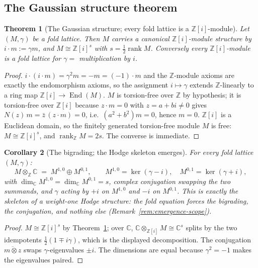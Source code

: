 \documentclass[11pt]{article}
\newcommand{\C}{\mathbb C}
\newcommand{\Z}{\mathbb Z}
\newcommand{\End}{\operatorname{End}}
\newtheorem{theorem}{Theorem}[section]
\newtheorem{corollary}[theorem]{Corollary}
\begin{document}
\subsection{The Gaussian structure theorem}

\begin{theorem}[The Gaussian structure; every fold lattice is a
{$\Z[i]$}-module]\label{thm:gaussian}
Let $(M,\gamma)$ be a fold lattice. Then $M$ carries a canonical
$\Z[i]$-module structure by $i\cdot m:=\gamma m$, and
$M\cong\Z[i]^s$ with $s=\tfrac12\operatorname{rank}M$. Conversely every
$\Z[i]$-module is a fold lattice for $\gamma=$ multiplication by $i$.
\end{theorem}

\begin{proof}
$i\cdot(i\cdot m)=\gamma^2m=-m=(-1)\cdot m$ and the $\Z$-module
axioms are exactly the endomorphism axioms, so the assignment
$i\mapsto\gamma$ extends $\Z$-linearly to a ring map
$\Z[i]\to\End(M)$. $M$ is torsion-free over $\Z$ by hypothesis; it is
torsion-free over $\Z[i]$ because $z\cdot m=0$ with $z=a+bi\ne 0$
gives $N(z)\,m=\bar z\,(z\cdot m)=0$, i.e.\
$(a^2+b^2)m=0$, hence $m=0$. $\Z[i]$ is a Euclidean domain, so the
finitely generated torsion-free module $M$ is free:
$M\cong\Z[i]^s$, and $\operatorname{rank}_\Z M=2s$. The converse is
immediate.
\end{proof}

\begin{corollary}[The bigrading; the Hodge skeleton emerges]
\label{cor:bigrading}
For every fold lattice $(M,\gamma)$:
\[
M\otimes_\Z\C\;=\;M^{1,0}\oplus M^{0,1},\qquad
M^{1,0}=\ker(\gamma-i),\quad M^{0,1}=\ker(\gamma+i),
\]
with $\dim_\C M^{1,0}=\dim_\C M^{0,1}=s$, complex conjugation swapping
the two summands, and $\gamma$ acting by $+i$ on $M^{1,0}$ and $-i$ on
$M^{0,1}$. This is exactly the skeleton of a weight-one Hodge
structure: the fold equation forces the bigrading, the conjugation,
and nothing else (Remark~\ref{rem:emergence-scope}).
\end{corollary}

\begin{proof}
$M\cong\Z[i]^s$ by Theorem~\ref{thm:gaussian}; over $\C$,
$\C\otimes_{\Z[i]}M\cong\C^s$ splits by the two idempotents
$\tfrac12(1\mp i\gamma)$, which is the displayed decomposition. The
conjugation $\overline{m\otimes z}$ swaps
$\gamma$-eigenvalues $\pm i$. The dimensions are equal because
$\gamma^2=-1$ makes the eigenvalues paired.
\end{proof}
\end{document}
